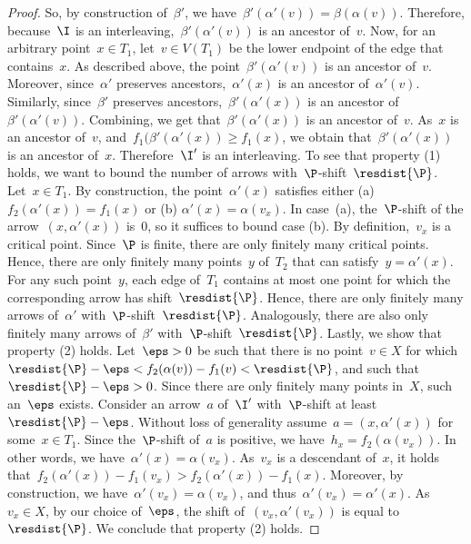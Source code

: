 \begin{proof}
So, by construction of~$\beta'$, we have~$\beta'(\alpha'(v)) = \beta(\alpha(v))$.
Therefore, because~$\I$ is an interleaving,~$\beta'(\alpha'(v))$ is an ancestor of~$v$.
Now, for an arbitrary point~$x \in T_1$, let~$v \in V(T_1)$ be the lower endpoint of the edge that contains~$x$.
As described above, the point~$\beta'(\alpha'(v))$ is an ancestor of~$v$.
Moreover, since~$\alpha'$ preserves ancestors,~$\alpha'(x)$ is an ancestor of~$\alpha'(v)$.
Similarly, since~$\beta'$ preserves ancestors,~$\beta'(\alpha'(x))$ is an ancestor of~$\beta'(\alpha'(v))$.
Combining, we get that~$\beta'(\alpha'(x))$ is an ancestor of~$v$.
As~$x$ is an ancestor of~$v$, and~$f_1(\beta'(\alpha'(x)) \ge f_1(x)$, we obtain that~$\beta'(\alpha'(x))$ is an ancestor of~$x$.
Therefore~$\I'$ is an interleaving.
%
To see that property (1) holds, we want to bound the number of arrows with~$\P$-shift~$\resdist{\P}$.
Let~$x \in T_1$.
By construction, the point~$\alpha'(x)$ satisfies either (a) $f_2(\alpha'(x)) = f_1(x)$ or (b) $\alpha'(x) = \alpha(v_x)$.
In case~(a), the~$\P$-shift of the arrow~$(x, \alpha'(x))$ is~$0$, so it suffices to bound case (b).
By definition,~$v_x$ is a critical point.
Since~$\P$ is finite, there are only finitely many critical points.
Hence, there are only finitely many points~$y$ of~$T_2$ that can satisfy~$y = \alpha'(x)$.
For any such point~$y$, each edge of~$T_1$ contains at most one point for which the corresponding arrow has shift~$\resdist{\P}$.
Hence, there are only finitely many arrows of~$\alpha'$ with~$\P$-shift~$\resdist{\P}$.
Analogously, there are also only finitely many arrows of~$\beta'$ with~$\P$-shift~$\resdist{\P}$.
%
Lastly, we show that property (2) holds.
Let~$\eps > 0$ be such that there is no point~$v \in X$ for which~$\resdist{\P} - \eps < f_2(\alpha(v)) - f_1(v) < \resdist{\P}$, and such that~$\resdist{\P} -\eps > 0$.
Since there are only finitely many points in~$X$, such an~$\eps$ exists.
Consider an arrow~$a$ of~$\I'$ with~$\P$-shift at least~$\resdist{\P} - \eps$.
Without loss of generality assume~$a = (x, \alpha'(x))$ for some~$x \in T_1$.
Since the~$\P$-shift of~$a$ is positive, we have~$h_x = f_2(\alpha(v_x))$.
In other words, we have~$\alpha'(x) = \alpha(v_x)$.
As~$v_x$ is a descendant of~$x$, it holds that~$f_2(\alpha'(x)) - f_1(v_x) > f_2(\alpha'(x)) - f_1(x)$.
Moreover, by construction, we have~$\alpha'(v_x) = \alpha(v_x)$, and thus~$\alpha'(v_x) = \alpha'(x)$.
As~$v_x \in X$, by our choice of~$\eps$, the shift of~$(v_x, \alpha'(v_x))$ is equal to~$\resdist{\P}$.
We conclude that property (2) holds.
\end{proof}
%
%
